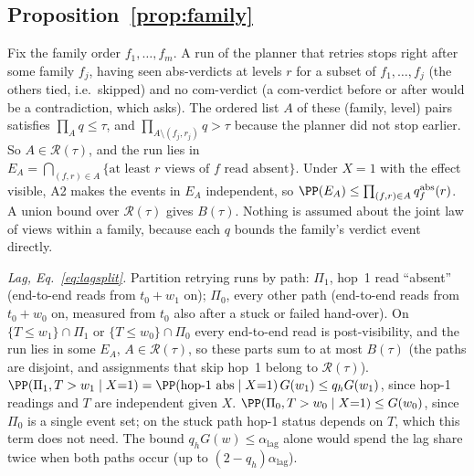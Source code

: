 \subsection{Proposition~\ref{prop:family}}
Fix the family order $f_1,\dots,f_m$. A run of the planner that retries stops right after some family $f_j$, having seen abs-verdicts at levels $r$ for a subset of
$f_1,\dots,f_j$ (the others tied, i.e.\ skipped) and no com-verdict (a com-verdict before or after would be a contradiction, which asks). The ordered list $A$ of these
(family, level) pairs satisfies $\prod_Aq\le\tau$, and $\prod_{A\setminus(f_j,r_j)}q>\tau$ because the planner did not stop earlier. So $A\in\mathcal R(\tau)$, and the run lies in
$E_A=\bigcap_{(f,r)\in A}\{\text{at least $r$ views of $f$ read absent}\}$. Under $X{=}1$ with the effect visible, A2 makes the events in $E_A$ independent, so
$\PP(E_A)\le\prod_{(f,r)\in A}q^{\mathrm{abs}}_f(r)$. A union bound over $\mathcal R(\tau)$ gives $B(\tau)$. Nothing is assumed about the joint law of views within a family,
because each $q$ bounds the family's verdict event directly.

\emph{Lag, Eq.~\eqref{eq:lagsplit}.} Partition retrying runs by path: $\Pi_1$, hop~1 read ``absent'' (end-to-end reads from $t_0+w_1$ on); $\Pi_0$, every other path (end-to-end reads
from $t_0+w_0$ on, measured from $t_0$ also after a stuck or failed hand-over). On $\{T\le w_1\}\cap\Pi_1$ or $\{T\le w_0\}\cap\Pi_0$ every end-to-end read is post-visibility, and the run
lies in some $E_A$, $A\in\mathcal R(\tau)$, so these parts sum to at most $B(\tau)$ (the paths are disjoint, and assignments that skip hop~1 belong to $\mathcal R(\tau)$).
$\PP(\Pi_1,T>w_1\mid X{=}1)=\PP(\text{hop-1 abs}\mid X{=}1)\,G(w_1)\le q_hG(w_1)$, since hop-1 readings and $T$ are independent given $X$. $\PP(\Pi_0,T>w_0\mid X{=}1)\le G(w_0)$,
since $\Pi_0$ is a single event set; on the stuck path hop-1 status depends on $T$, which this term does not need. The bound $q_hG(w)\le\alpha_{\mathrm{lag}}$ alone would spend the lag
share twice when both paths occur (up to $(2-q_h)\alpha_{\mathrm{lag}}$).

